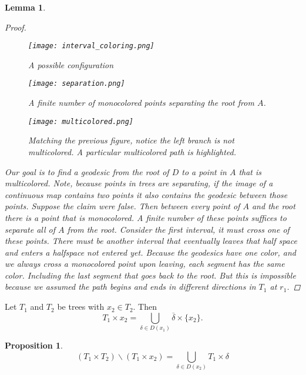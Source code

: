 \documentclass[12pt,parskip=full]{report}
\theoremstyle{plain}
\newtheorem{lem}[thm]{Lemma}
\newtheorem{prop}[thm]{Proposition}
\theoremstyle{definition}
\begin{document}
\begin{lem}
\begin{proof}
\begin{figure}[!h]
    \centering
    \texttt{[image: interval\_coloring.png]}
    \caption{A possible configuration}
    \label{fig:square}
\end{figure}
\begin{figure}[!h]
    \centering
    \texttt{[image: separation.png]}
    \caption{A finite number of monocolored points separating the root from $A$.}
    \label{fig:square}
\end{figure}
\begin{figure}[!h]
    \centering
    \texttt{[image: multicolored.png]}
    \caption{Matching the previous figure, notice the left branch is not multicolored. A particular multicolored path is highlighted.}
    \label{fig:square}
\end{figure}


        Our goal is to find a geodesic from the root of \(D\) to a point in \(A\) that is multicolored. Note, because points in trees are separating, if the image of a continuous map contains two points it also contains the geodesic between those points. Suppose the claim were false. Then between every point of \(A\) and the root there is a point that is monocolored. A finite number of these points suffices to separate all of \(A\) from the root. Consider the first interval, it must cross one of these points. There must be another interval that eventually leaves that half space and enters a halfspace not entered yet. Because the geodesics have one color, and we always cross a monocolored point upon leaving, each segment has the same color. Including the last segment that goes back to the root. But this is impossible because we assumed the path begins and ends in different directions in \(T_{1}\) at \(r_{1}\).

    \end{proof}
\end{lem}

\begin{pro}
\label{prop:directionunion}
Let $T_1$ and $T_2$ be trees with $x_2\in T_2$. Then $$T_1\times x_2 = \bigcup_{\delta \in D(x_1)} \overline{\delta}\times \{x_2\}.$$
\end{pro}


\begin{prop}
\label{prop:sliceunion}
\[ \left(T_1 \times T_2\right) \smallsetminus \left(T_1\times x_2\right) = \bigcup_{\delta\in D(x_2)} T_1\times \delta\]
\end{prop}
\end{document}
